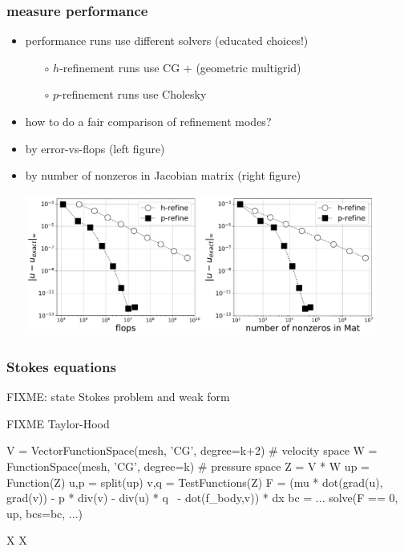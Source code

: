 \documentclass[hide notes,intlimits,usenames,dvipsnames]{beamer}
\begin{document}
\begin{frame}[fragile]
\frametitle{measure performance}
\begin{itemize}
\item performance runs use different solvers (educated choices!)
    \begin{itemize}
    \item[$\circ$] $h$-refinement runs use CG $+$ (geometric multigrid)
    \item[$\circ$] $p$-refinement runs use Cholesky
    \end{itemize}
\item how to do a fair comparison of refinement modes?
\item by error-vs-flops (left figure)
\item by number of nonzeros in Jacobian matrix (right figure)

\medskip
\mbox{\includegraphics[width=0.46\textwidth]{hprefine-Linf-flops}\quad\includegraphics[width=0.45\textwidth]{hprefine-Linf-nnz}}
\end{itemize}
\end{frame}


\begin{frame}[fragile]
\frametitle{Stokes equations}

FIXME: state Stokes problem and weak form

FIXME Taylor-Hood

\begin{scode}
V = VectorFunctionSpace(mesh, 'CG', degree=k+2)  # velocity space
W = FunctionSpace(mesh, 'CG', degree=k)          # pressure space
Z = V * W
up = Function(Z)
u,p = split(up)
v,q = TestFunctions(Z)
F = (mu * dot(grad(u), grad(v)) - p * div(v) - div(u) * q \
     - dot(f_body,v)) * dx
bc = ...
solve(F == 0, up, bcs=bc, ...)
\end{scode}
\end{frame}


\begin{frame}{X}
X
\end{frame}
\end{document}
